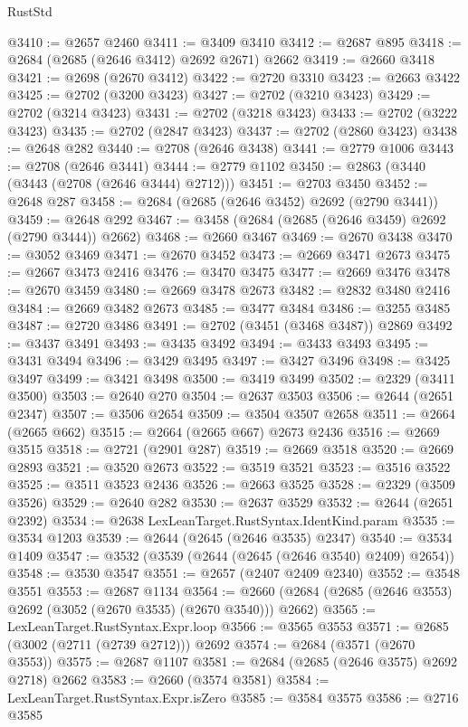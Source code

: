 \begin{lexlean}{RustStd}
\begin{coremodule}
@3410 := @2657 @2460
@3411 := @3409 @3410
@3412 := @2687 @895
@3418 := @2684 (@2685 (@2646 @3412) @2692 @2671) @2662
@3419 := @2660 @3418
@3421 := @2698 (@2670 @3412)
@3422 := @2720 @3310
@3423 := @2663 @3422
@3425 := @2702 (@3200 @3423)
@3427 := @2702 (@3210 @3423)
@3429 := @2702 (@3214 @3423)
@3431 := @2702 (@3218 @3423)
@3433 := @2702 (@3222 @3423)
@3435 := @2702 (@2847 @3423)
@3437 := @2702 (@2860 @3423)
@3438 := @2648 @282
@3440 := @2708 (@2646 @3438)
@3441 := @2779 @1006
@3443 := @2708 (@2646 @3441)
@3444 := @2779 @1102
@3450 := @2863 (@3440 (@3443 (@2708 (@2646 @3444) @2712)))
@3451 := @2703 @3450
@3452 := @2648 @287
@3458 := @2684 (@2685 (@2646 @3452) @2692 (@2790 @3441))
@3459 := @2648 @292
@3467 := @3458 (@2684 (@2685 (@2646 @3459) @2692 (@2790 @3444)) @2662)
@3468 := @2660 @3467
@3469 := @2670 @3438
@3470 := @3052 @3469
@3471 := @2670 @3452
@3473 := @2669 @3471 @2673
@3475 := @2667 @3473 @2416
@3476 := @3470 @3475
@3477 := @2669 @3476
@3478 := @2670 @3459
@3480 := @2669 @3478 @2673
@3482 := @2832 @3480 @2416
@3484 := @2669 @3482 @2673
@3485 := @3477 @3484
@3486 := @3255 @3485
@3487 := @2720 @3486
@3491 := @2702 (@3451 (@3468 @3487)) @2869
@3492 := @3437 @3491
@3493 := @3435 @3492
@3494 := @3433 @3493
@3495 := @3431 @3494
@3496 := @3429 @3495
@3497 := @3427 @3496
@3498 := @3425 @3497
@3499 := @3421 @3498
@3500 := @3419 @3499
@3502 := @2329 (@3411 @3500)
@3503 := @2640 @270
@3504 := @2637 @3503
@3506 := @2644 (@2651 @2347)
@3507 := @3506 @2654
@3509 := @3504 @3507 @2658
@3511 := @2664 (@2665 @662)
@3515 := @2664 (@2665 @667) @2673 @2436
@3516 := @2669 @3515
@3518 := @2721 (@2901 @287)
@3519 := @2669 @3518
@3520 := @2669 @2893
@3521 := @3520 @2673
@3522 := @3519 @3521
@3523 := @3516 @3522
@3525 := @3511 @3523 @2436
@3526 := @2663 @3525
@3528 := @2329 (@3509 @3526)
@3529 := @2640 @282
@3530 := @2637 @3529
@3532 := @2644 (@2651 @2392)
@3534 := @2638 LexLeanTarget.RustSyntax.IdentKind.param
@3535 := @3534 @1203
@3539 := @2644 (@2645 (@2646 @3535) @2347)
@3540 := @3534 @1409
@3547 := @3532 (@3539 (@2644 (@2645 (@2646 @3540) @2409) @2654))
@3548 := @3530 @3547
@3551 := @2657 (@2407 @2409 @2340)
@3552 := @3548 @3551
@3553 := @2687 @1134
@3564 := @2660 (@2684 (@2685 (@2646 @3553) @2692 (@3052 (@2670 @3535) (@2670 @3540))) @2662)
@3565 := LexLeanTarget.RustSyntax.Expr.loop
@3566 := @3565 @3553
@3571 := @2685 (@3002 (@2711 (@2739 @2712))) @2692
@3574 := @2684 (@3571 (@2670 @3553))
@3575 := @2687 @1107
@3581 := @2684 (@2685 (@2646 @3575) @2692 @2718) @2662
@3583 := @2660 (@3574 @3581)
@3584 := LexLeanTarget.RustSyntax.Expr.isZero
@3585 := @3584 @3575
@3586 := @2716 @3585

\end{coremodule}
\end{lexlean}
